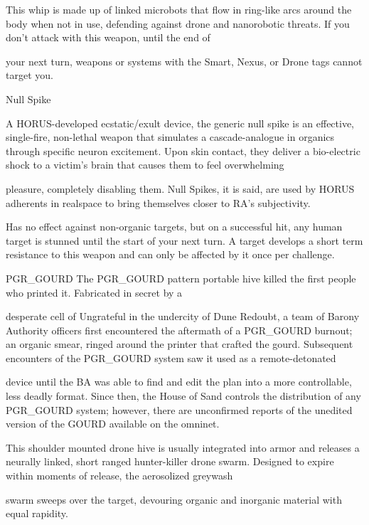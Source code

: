 This whip is made up of linked microbots that flow in ring-like arcs around the body when not in use,  
defending against drone and nanorobotic threats. If you don’t attack with this weapon, until the end of  

your next turn, weapons or systems with the Smart, Nexus, or Drone tags cannot target you.
 

Null Spike  

A HORUS-developed ecstatic/exult device, the generic null spike is an effective, single-fire, non-lethal  
weapon that simulates a cascade-analogue in organics through specific neuron excitement. Upon skin  
contact, they deliver a bio-electric shock to a victim’s brain that causes them to feel overwhelming  

pleasure, completely disabling them. Null Spikes, it is said, are used by HORUS adherents in realspace to  
bring themselves closer to RA’s subjectivity. 
 

                                                                                                             


Has no effect against non-organic targets, but on a successful hit, any human target is stunned until the  
start of your next turn. A target develops a short term resistance to this weapon and can only be affected  
by it once per challenge.
 

PGR\_GOURD  
The PGR\_GOURD pattern portable hive killed the first people who printed it. Fabricated in secret by a  

desperate cell of Ungrateful in the undercity of Dune Redoubt, a team of Barony Authority officers first  
encountered the aftermath of a PGR\_GOURD burnout; an organic smear, ringed around the printer that  
crafted the gourd. Subsequent encounters of the PGR\_GOURD system saw it used as a remote-detonated  

device until the BA was able to find and edit the plan into a more controllable, less deadly format. Since  
then, the House of Sand controls the distribution of any PGR\_GOURD system; however, there are  
unconfirmed reports of the unedited version of the GOURD available on the omninet.   

This shoulder mounted drone hive is usually integrated into armor and releases a neurally linked, short  
ranged hunter-killer drone swarm. Designed to expire within moments of release, the aerosolized greywash  

swarm sweeps over the target, devouring organic and inorganic material with equal rapidity. 
 

